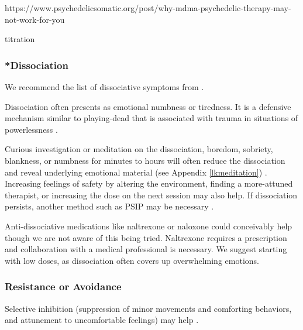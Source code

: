 \documentclass[12pt,letterpaper]{book}
\begin{document}
https://www.psychedelicsomatic.org/post/why-mdma-psychedelic-therapy-may-not-work-for-you

titration

\subsubsection{*Dissociation}

We recommend the list of dissociative symptoms from \textcite{cheetahSigns}.

Dissociation often presents as emotional numbness or tiredness. It is a defensive mechanism similar to playing-dead that is associated with trauma in situations of powerlessness \cite{loewensteinDissociation}.

Curious investigation or meditation on the dissociation, boredom, sobriety, blankness, or numbness for minutes to hours will often reduce the dissociation and reveal underlying emotional material (see Appendix \ref{lkmeditation}) \cite{razviPSIP}.  Increasing feelings of safety by altering the environment, finding a more-attuned therapist, or increasing the dose on the next session may also help. If dissociation persists, another method such as PSIP may be necessary \cite{razviPSIP}.

Anti-dissociative medications like naltrexone or naloxone could conceivably help though we are not aware of this being tried. Naltrexone requires a prescription and collaboration with a medical professional is necessary. We suggest starting with low doses, as dissociation often covers up overwhelming emotions. 

\subsubsection{Resistance or Avoidance}
\label{selectiveInhibition}
Selective inhibition (suppression of minor movements and comforting behaviors, and attunement to uncomfortable feelings) may help \cite{razviPSIP}.

 
\end{document}
